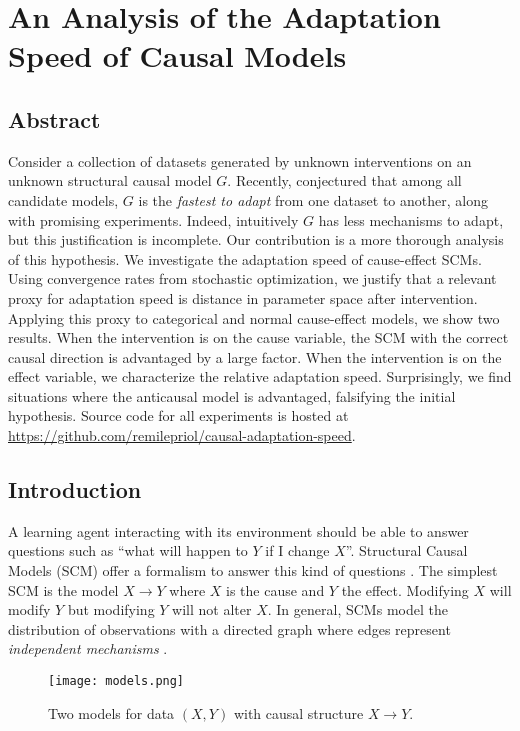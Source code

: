 \chapter{An Analysis of the Adaptation Speed of Causal Models}

\section*{Abstract}
Consider a collection of datasets generated by unknown interventions on an unknown structural causal model $G$.
Recently, \citet{bengio2019meta} conjectured that among all candidate models, $G$ is the \emph{fastest to adapt} from one dataset to another, along with promising experiments. 
Indeed, intuitively $G$ has less mechanisms to adapt, but this justification is incomplete.
Our contribution is a more thorough analysis of this hypothesis.
We investigate the adaptation speed of cause-effect SCMs.
Using convergence rates from stochastic optimization, we justify that a relevant proxy for adaptation speed is distance in parameter space after intervention.
Applying this proxy to categorical and normal cause-effect models, we show two results.
When the intervention is on the cause variable, the SCM with the correct causal direction is advantaged by a large factor.
When the intervention is on the effect variable, we characterize the relative adaptation speed. 
Surprisingly, we find situations where the anticausal model is advantaged, falsifying the initial hypothesis.
Source code for all experiments is hosted at 
\url{https://github.com/remilepriol/causal-adaptation-speed}.


\section{Introduction}

A learning agent interacting with its environment should be able to answer questions such as ``what will happen to $Y$ if I change $X$''.
Structural Causal Models (SCM) offer a formalism to answer this kind of questions \citep{pearl2009causality,peters2017elements}. 
The simplest SCM is the model $X\rightarrow Y$ where $X$ is the cause and $Y$ the effect.
Modifying $X$ will modify $Y$ but modifying $Y$ will not alter $X$.
In general, SCMs model the distribution of observations with a directed graph where edges represent \textit{independent mechanisms} \citep{janzing2010causal}.

\begin{wrapfigure}[6]{l}{.5\textwidth} 
    \centering
    \texttt{[image: models.png]}
    \caption{Two models for data $(X, Y)$ with causal structure $X\rightarrow Y$.}
    \label{fig:cause-effect}
\end{wrapfigure}

